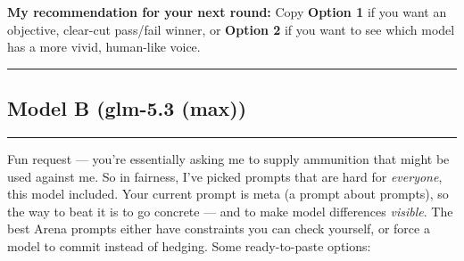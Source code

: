 \documentclass[11pt, a4paper]{article}
\begin{document}
        \vspace{0.2cm}
        \textbf{My recommendation for your next round:} Copy \textbf{Option 1} if you want an objective, clear-cut pass/fail winner, or \textbf{Option 2} if you want to see which model has a more vivid, human-like voice.

\vspace{0.2cm}
\noindent\rule{\textwidth}{0.5pt}

\vspace{0.5cm}

\subsection*{Model B (glm-5.3 (max))}
\noindent\rule{\textwidth}{0.5pt}
\vspace{0.2cm}

Fun request — you're essentially asking me to supply ammunition that might be used against me. So in fairness, I've picked prompts that are hard for \textit{everyone}, this model included. Your current prompt is meta (a prompt about prompts), so the way to beat it is to go concrete — and to make model differences \textit{visible}. The best Arena prompts either have constraints you can check yourself, or force a model to commit instead of hedging. Some ready-to-paste options:
        
\end{document}
